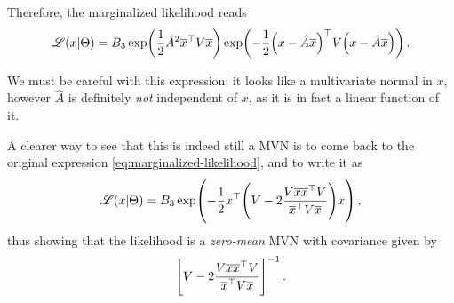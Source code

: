 \documentclass[main.tex]{subfiles}
\begin{document}
Therefore, the marginalized likelihood reads 
%
\begin{align}
\mathscr{L}(x | \Theta ) = B_3 \exp( \frac{1}{2} \hat{A}^2 \overline{x}^{\top} V \overline{x}) \exp(- \frac{1}{2} \qty(x - \hat{A} \overline{x})^{\top} V \qty(x - \hat{A} \overline{x}))
\,.
\end{align}

We must be careful with this expression: it looks like a multivariate normal in \(x\), however \(\hat{A}\) is definitely \emph{not} independent of \(x\), as it is in fact a linear function of it. 

A clearer way to see that this is indeed still a MVN is to come back to the original expression \eqref{eq:marginalized-likelihood}, and to write it as 
%
\begin{align}
\mathscr{L} (x | \Theta ) = B_3 \exp(- \frac{1}{2} x^{\top} \qty(V - 2 \frac{V \overline{x} \overline{x}^{\top} V}{\overline{x}^{\top} V \overline{x}}) x )
\,,
\end{align}
%
thus showing that the likelihood is a \emph{zero-mean} MVN with covariance given by 
%
\begin{align}
\qty[V - 2 \frac{V \overline{x} \overline{x}^{\top} V}{\overline{x}^{\top} V \overline{x}}]^{-1}
\,.
\end{align}
\end{document}
